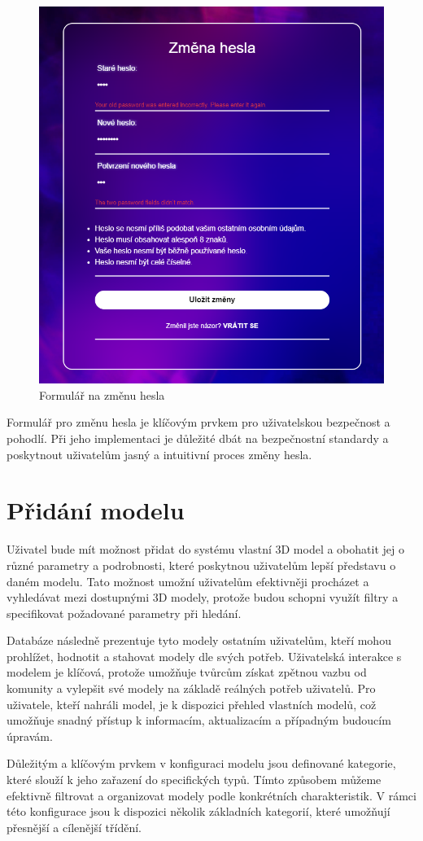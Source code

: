 \documentclass[12pt, a4paper,
twoside,        %
openright
]{report}
\begin{document}
\begin{figure}[h]
			\centering
			\includegraphics[width=0.5\linewidth]{image/change-password.png} 
			\caption{Formulář na změnu hesla}
		\end{figure}
		Formulář pro změnu hesla je klíčovým prvkem pro uživatelskou bezpečnost a pohodlí. Při jeho implementaci je důležité dbát na bezpečnostní standardy a poskytnout uživatelům jasný a intuitivní proces změny hesla.
		\newpage
	\section[Přidání modelu]{Přidání modelu}
	Uživatel bude mít možnost přidat do systému vlastní 3D model a obohatit jej o různé parametry a podrobnosti, které poskytnou uživatelům lepší představu o daném modelu. Tato možnost umožní uživatelům efektivněji procházet a vyhledávat mezi dostupnými 3D modely, protože budou schopni využít filtry a specifikovat požadované parametry při hledání.
	
	Databáze následně prezentuje tyto modely ostatním uživatelům, kteří mohou prohlížet, hodnotit a stahovat modely dle svých potřeb. Uživatelská interakce s modelem je klíčová, protože umožňuje tvůrcům získat zpětnou vazbu od komunity a vylepšit své modely na základě reálných potřeb uživatelů. Pro uživatele, kteří nahráli model, je k dispozici přehled vlastních modelů, což umožňuje snadný přístup k informacím, aktualizacím a případným budoucím úpravám. 
	
Důležitým a klíčovým prvkem v konfiguraci modelu jsou definované kategorie, které slouží k jeho zařazení do specifických typů. Tímto způsobem můžeme efektivně filtrovat a organizovat modely podle konkrétních charakteristik. V rámci této konfigurace jsou k dispozici několik základních kategorií, které umožňují přesnější a cílenější třídění.
\end{document}
